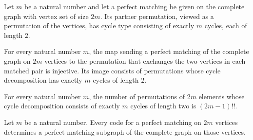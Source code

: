 \begin{definition}
\label{FABL.completePerfectMatchingToPairingPerm}
\leanok
{}
Let $m$ be a natural number and let a perfect matching be given on the complete graph
with vertex set of size $2m$. Its partner permutation, viewed as a permutation of the
vertices, has cycle type consisting of exactly $m$ cycles, each of length $2$.
\end{definition}

\begin{theorem}
\label{FABL.completePerfectMatchingToPairingPerm_injective}
\leanok
{}
For every natural number $m$, the map sending a perfect matching of the complete graph
on $2m$ vertices to the permutation that exchanges the two vertices in each matched pair
is injective. Its image consists of permutations whose cycle decomposition has exactly
$m$ cycles of length $2$.
\end{theorem}

\begin{theorem}
\label{FABL.card_pairingPerm}
\leanok
{}
For every natural number $m$, the number of permutations of $2m$ elements whose cycle
decomposition consists of exactly $m$ cycles of length two is $(2m-1)!!$.
\end{theorem}

\begin{definition}
\label{FABL.perfectMatchingGraphOfCode}
\leanok
{}
Let $m$ be a natural number. Every code for a perfect matching on $2m$ vertices
determines a perfect matching subgraph of the complete graph on those vertices.
\end{definition}

